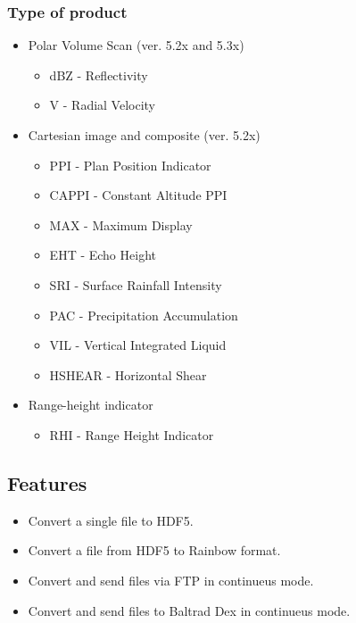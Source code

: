 \documentclass[11p]{article}
\begin{document}
\subsubsection*{Type of product}
\begin{itemize}
  \item Polar Volume Scan (ver. 5.2x and 5.3x)
  \begin{itemize}
    \item dBZ - Reflectivity
    \item V - Radial Velocity
  \end{itemize}
  \item Cartesian image and composite (ver. 5.2x)
  \begin{itemize}
    \item PPI - Plan Position Indicator
    \item CAPPI - Constant Altitude PPI
    \item MAX - Maximum Display
    \item EHT - Echo Height
    \item SRI - Surface Rainfall Intensity
    \item PAC - Precipitation Accumulation
    \item VIL - Vertical Integrated Liquid
    \item HSHEAR - Horizontal Shear 
  \end{itemize} 
  \item Range-height indicator
  \begin{itemize}
    \item RHI - Range Height Indicator
  \end{itemize} 
\end{itemize} 

\subsection{Features}

\begin{itemize}
    \item Convert a single file to HDF5.
    \item Convert a file from HDF5 to Rainbow format.
    \item Convert and send files via FTP in continueus mode.
    \item Convert and send files to Baltrad Dex in continueus mode.
    
\end{itemize}
\end{document}

